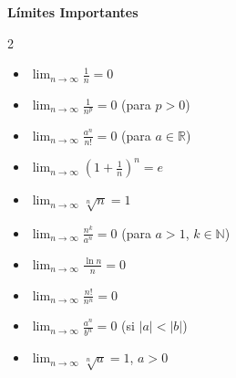 \documentclass[12pt]{book}
\begin{document}
 
\pagebreak
 \begin{mdframed}[backgroundcolor=gray!10!white]
    \begin{center}
    {\Large \textbf{Límites Importantes}}\end{center}\begin{multicols}{2}
    \begin{itemize}
        \item $\displaystyle \lim_{n \to \infty} \frac{1}{n} = 0$
        \item $\displaystyle \lim_{n \to \infty} \frac{1}{n^p} = 0$ \quad (para $p > 0$)
        \item $\displaystyle \lim_{n \to \infty} \frac{a^n}{n!} = 0$ \quad (para $a \in \mathbb{R}$)
        \item $\displaystyle \lim_{n \to \infty} \left(1 + \frac{1}{n}\right)^n = e$
        \item $\displaystyle \lim_{n \to \infty} \sqrt[n]{n} = 1$
        \item $\displaystyle \lim_{n \to \infty} \frac{n^k}{a^n} = 0$ \quad (para $a > 1$, $k \in \mathbb{N}$)
        \item $\displaystyle \lim_{n \to \infty} \frac{\ln n}{n} = 0$
        \item $\displaystyle \lim_{n \to \infty} \frac{n!}{n^n} = 0$
        \item $\displaystyle \lim_{n \to \infty} \frac{a^n}{b^n} = 0$ \quad (si $|a| < |b|$)
        \item $\displaystyle \lim_{n \to \infty} \sqrt[n]{a} = 1$, $a>0$ 
    \end{itemize}
    \end{multicols}
\end{mdframed}
\end{document}
